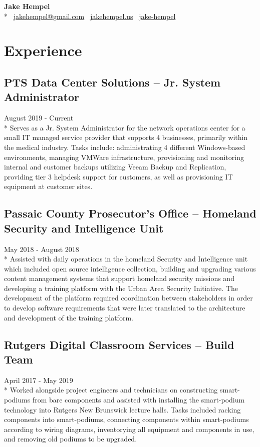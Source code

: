 \documentclass{article}
\begin{document}
\begin{samepage}
\begin{center}
\huge{\textbf{Jake Hempel}} \\*
\large{\faEnvelope \, \href{mailto:jakehempel@gmail.com}{jakehempel@gmail.com} 
\faGlobe \, \href{https://jakehempel.us}{jakehempel.us}}  
\faLinkedinSquare \, \href{https://www.linkedin.com/in/jake-hempel/}{jake-hempel}
\end{center}

\section{Experience}

\subsection{PTS Data Center Solutions -- Jr. System Administrator}
August 2019 - Current\\*
Serves as a Jr. System Administrator for the network operations center for a small IT managed service provider that supports 4 businesses, primarily within the medical industry. Tasks include: administrating 4 different Windows-based environments, managing VMWare infrastructure, provisioning and monitoring internal and customer backups utilizing Veeam Backup and Replication, providing tier 3 helpdesk support for customers, as well as provisioning IT equipment at customer sites.

\subsection{Passaic County Prosecutor's Office -- Homeland Security and Intelligence Unit}
May 2018 - August 2018\\*
Assisted with daily operations in the homeland Security and Intelligence unit which included open source intelligence collection, building and upgrading various content management systems that support homeland security missions and developing a training platform with the Urban Area Security Initiative.  The development of the platform required coordination between stakeholders in order to develop software requirements that were later translated to the architecture and development of the training platform.

\subsection{Rutgers Digital Classroom Services -- Build Team}
April 2017 - May 2019\\*
Worked alongside project engineers and technicians on constructing smart-podiums from bare components and assisted with installing the smart-podium technology into Rutgers New Brunswick lecture halls. Tasks included racking components into smart-podiums, connecting components within smart-podiums according to wiring diagrams, inventorying all equipment and components in use, and removing old podiums to be upgraded.


\end{samepage}
\end{document}
